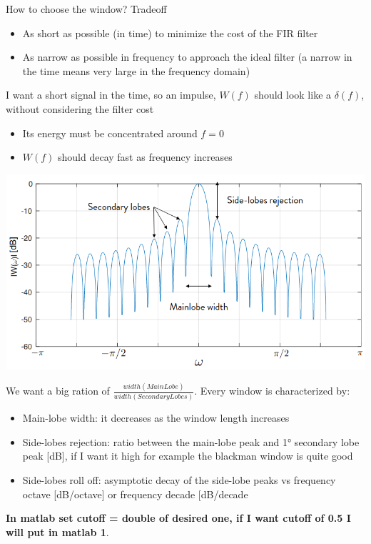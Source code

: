 How to choose the window? Tradeoff
\begin{itemize}
    \item As short as possible (in time) to minimize the cost of the FIR filter
    \item As narrow as possible in frequency to approach the ideal filter (a narrow in the time means very large in the frequency domain)
\end{itemize}
I want a short signal in the time, so an impulse, $W(f)$ should look like a $\delta(f)$, without considering the filter cost
\begin{itemize}
    \item Its energy must be concentrated around $f=0$
    \item $W(f)$ should decay fast as frequency increases
\end{itemize}
\begin{center}
    \includegraphics[width=1\textwidth]{images/lobe.png}
\end{center}
We want a big ration of $\frac{width(MainLobe)}{width(SecondaryLobes)}$. Every window is characterized by:
\begin{itemize}
    \item Main-lobe width: it decreases as the window length increases
    \item Side-lobes rejection: ratio between the main-lobe peak and 1° secondary lobe peak [dB], if I want it high for example the blackman window is quite good
    \item Side-lobes roll off: asymptotic decay of the side-lobe peaks vs frequency octave [dB/octave] or frequency decade [dB/decade
\end{itemize}
\textbf{In matlab set cutoff = double of desired one, if I want cutoff of 0.5 I will put in matlab 1}.

